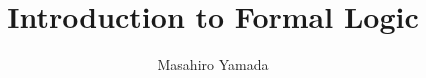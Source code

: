 \documentclass[table]{logicbook}
\newcommand{\chdir}{chapters}
\newcommand{\bibdir}{\chdir/bib}
\begin{document}
\newpage
\title{Introduction to Formal Logic}
\author{Masahiro Yamada}
\date{}

\frontmatter \newpage
\maketitle



\setcounter{tocdepth}{1}
\tableofcontents

\newpage
\mainmatter




\end{document}
